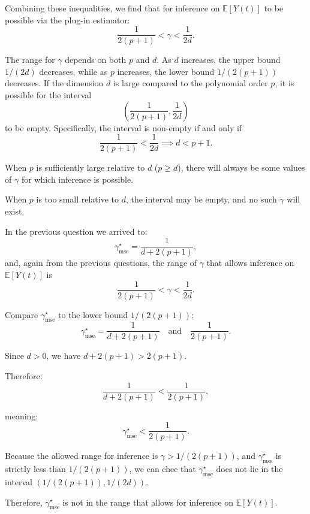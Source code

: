 \documentclass{article}
\begin{document}
Combining these inequalities, we find that for inference on \(\mathbb{E}[Y(t)]\) to be possible via the plug-in estimator:
\[
\frac{1}{2(p+1)} < \gamma < \frac{1}{2d}.
\]

The range for \(\gamma\) depends on both \( p \) and \( d \). As \( d \) increases, the upper bound \(1/(2d)\) decreases, while as \( p \) increases, the lower bound \(1/(2(p+1))\) decreases. If the dimension \( d \) is large compared to the polynomial order \( p \), it is possible for the interval
\[
\left(\frac{1}{2(p+1)}, \frac{1}{2d}\right)
\]
to be empty. Specifically, the interval is non-empty if and only if
\[
\frac{1}{2(p+1)} < \frac{1}{2d} \implies d < p+1.
\]

When \( p \) is sufficiently large relative to \( d \) (\( p \ge d \)), there will always be some values of \(\gamma\) for which inference is possible.

When \( p \) is too small relative to \( d \), the interval may be empty, and no such \(\gamma\) will exist.


In the previous question we arrived to:
\[
\gamma^\star_{\text{mse}} = \frac{1}{d + 2(p+1)},
\]
and, again from the previous questions, the range of \(\gamma\) that allows inference on \(\mathbb{E}[Y(t)]\) is
\[
\frac{1}{2(p+1)} < \gamma < \frac{1}{2d}.
\]

Compare \(\gamma^\star_{\text{mse}}\) to the lower bound \( 1/(2(p+1)) \):
\[
\gamma^\star_{\text{mse}} = \frac{1}{d + 2(p+1)} \quad \text{and} \quad \frac{1}{2(p+1)}.
\]

Since \(d>0\), we have \(d+2(p+1) > 2(p+1)\).

Therefore:
\[
\frac{1}{d + 2(p+1)} < \frac{1}{2(p+1)},
\]

meaning:
\[
\gamma^\star_{\text{mse}} < \frac{1}{2(p+1)}.
\]

Because the allowed range for inference is \(\gamma > 1/(2(p+1))\), and \(\gamma^\star_{\text{mse}}\) is strictly less than \(1/(2(p+1))\), we can chec that \(\gamma^\star_{\text{mse}}\) does not lie in the interval \((1/(2(p+1)), 1/(2d))\).

Therefore, \(\gamma^\star_{\text{mse}}\) is not in the range that allows for inference on \(\mathbb{E}[Y(t)]\).
\end{document}
